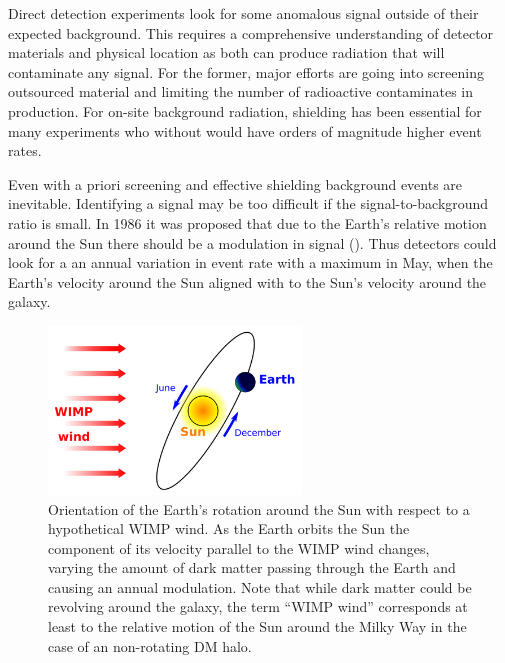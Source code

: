  Direct detection experiments look for some anomalous signal outside of their expected background.  This requires a comprehensive
 understanding of detector materials and physical location as both can produce radiation that will contaminate any signal.  For the
 former, major efforts are going into screening outsourced material and limiting the number of radioactive contaminates in
 production.  For on-site background radiation, shielding has been essential for many experiments who without would have orders
 of magnitude higher event rates.
 
 Even with a priori screening and effective shielding background events are inevitable.  Identifying a signal may be too
 difficult if the signal-to-background ratio is small.  In 1986 it was proposed
 that due to the Earth's relative motion around the Sun there should be a modulation in signal ().  Thus
 detectors could look for a an annual variation in event rate with a maximum in May, when the Earth's velocity around the
 Sun aligned with to the Sun's velocity around the galaxy.

\begin{figure}
\includegraphics[width=0.6\textwidth]{wimp_wind}
\caption{Orientation of the Earth's rotation around the Sun with respect to a hypothetical WIMP wind.  As the Earth orbits the Sun
the component of its velocity parallel to the WIMP wind changes, varying the amount of dark matter passing through the Earth and
causing an annual modulation.  Note that while dark matter could be revolving around the galaxy, the term ``WIMP wind'' corresponds at
least to the relative motion of the Sun around the Milky Way in the case of an non-rotating DM halo.}
\label{fig:direct_detect_modulation}
\end{figure}
 
 
 \begin{figure}
  \label{fig:energy_channels}
 \end{figure}
 
 
